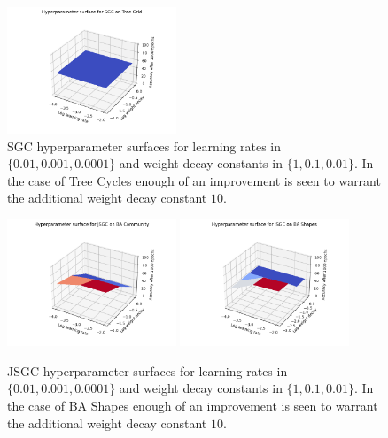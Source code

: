 \begin{figure}
    \includegraphics[width=0.45\textwidth]{figures/SGC-Tree-Grid-surface}
    \caption{SGC hyperparameter surfaces for learning rates in $\{0.01, 0.001, 0.0001\}$ and weight decay constants in $\{1, 0.1, 0.01\}$. In the case of Tree Cycles enough of an improvement is seen to warrant the additional weight decay constant $10$.}
    \label{fig:SGC-surfaces}
\end{figure}

\begin{figure}
    \centering
    \includegraphics[width=0.45\textwidth]{figures/JSGC-BA-Community-surface}
    \includegraphics[width=0.45\textwidth]{figures/JSGC-BA-Shapes-surface}
    \caption{JSGC hyperparameter surfaces for learning rates in $\{0.01, 0.001, 0.0001\}$ and weight decay constants in $\{1, 0.1, 0.01\}$. In the case of BA Shapes enough of an improvement is seen to warrant the additional weight decay constant $10$.}
    \label{fig:JSGC-surfaces}
\end{figure}

